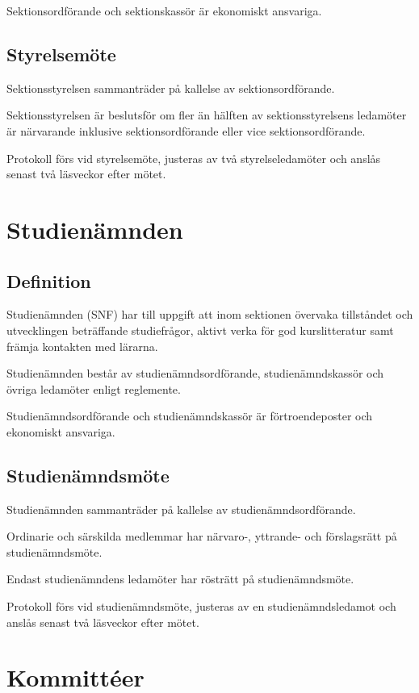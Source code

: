 \documentclass{styrdokument}
\begin{document}
\? Sektionsordförande och sektionskassör är ekonomiskt ansvariga.

\subsection{Styrelsemöte}

\? Sektionsstyrelsen sammanträder på kallelse av sektionsordförande.

\? Sektionsstyrelsen är beslutsför om fler än hälften av sektionsstyrelsens ledamöter är närvarande inklusive sektionsordförande eller vice sektionsordförande.

\? Protokoll förs vid styrelsemöte, justeras av två styrelseledamöter och anslås senast två läsveckor efter mötet.

\section{Studienämnden}
\subsection{Definition}

\? Studienämnden (SNF) har till uppgift att inom sektionen övervaka tillståndet och utvecklingen beträffande studiefrågor, aktivt verka för god kurslitteratur samt främja kontakten med lärarna.

\? Studienämnden består av studienämndsordförande, studienämndskassör och övriga ledamöter enligt reglemente.

\? Studienämndsordförande och studienämndskassör är förtroendeposter och ekonomiskt ansvariga.

\subsection{Studienämndsmöte}

\? Studienämnden sammanträder på kallelse av studienämndsordförande.

\? Ordinarie och särskilda medlemmar har närvaro-, yttrande- och förslagsrätt på studienämndsmöte.
\label{ratt.snf}

\? Endast studienämndens ledamöter har rösträtt på studienämndsmöte.

\? Protokoll förs vid studienämndsmöte, justeras av en studienämndsledamot och anslås senast två läsveckor efter mötet.

\section{Kommittéer}
\end{document}
